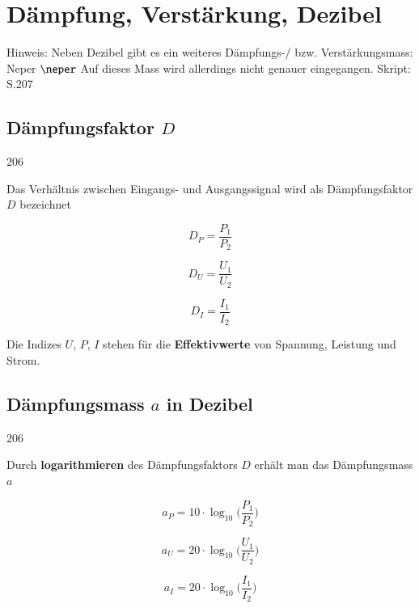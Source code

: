 \section{Dämpfung, Verstärkung, Dezibel}

Hinweis: Neben Dezibel gibt es ein weiteres Dämpfungs-/ bzw. Verstärkungsmass: Neper $\neper$
Auf dieses Mass wird allerdings nicht genauer eingegangen. Skript: S.207


\subsection{Dämpfungsfaktor \texorpdfstring{$D$}{D}}{206}

Das Verhältnis zwischen Eingangs- und Ausgangssignal wird als Dämpfungsfaktor $D$ bezeichnet

\begin{minipage}[c]{0.3\columnwidth}
    $$ \boxed{ D_{P} = \frac{P_{1}}{P_{2}} } $$
\end{minipage}
\hfill
\begin{minipage}[c]{0.3\columnwidth}
    $$ \boxed{ D_{U} = \frac{U_{1}}{U_{2}} } $$
\end{minipage}
\hfill
\begin{minipage}[c]{0.3\columnwidth}
    $$ \boxed{ D_{I} = \frac{I_{1}}{I_{2}} } $$
\end{minipage}

Die Indizes $U$, $P$, $I$ stehen für die \textbf{Effektivwerte} von Spannung, Leistung und Strom.


\subsection{Dämpfungsmass \texorpdfstring{$a$}{a} in Dezibel}{206}

Durch \textbf{logarithmieren} des Dämpfungsfaktors $D$ erhält man das Dämpfungsmass $a$

\begin{minipage}[c]{0.3\columnwidth}
    $$ \boxed{ a_{P} =  10 \cdot \log_{10} \Big( \frac{P_{1}}{P_{2}} \Big) } $$
\end{minipage}
\hfill
\begin{minipage}[c]{0.3\columnwidth}
    $$ \boxed{ a_{U} = 20 \cdot \log_{10} \Big( \frac{U_{1}}{U_{2}} \Big) } $$
\end{minipage}
\hfill
\begin{minipage}[c]{0.3\columnwidth}
    $$ \boxed{ a_{I} = 20 \cdot \log_{10} \Big( \frac{I_{1}}{I_{2}} \Big) } $$
\end{minipage}


